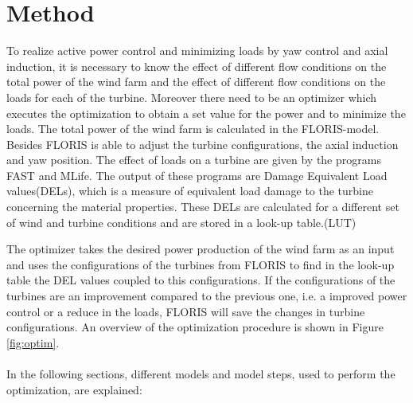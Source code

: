 \section{Method}
\label{sec:method}
	
	To realize active power control and minimizing loads by yaw control and axial induction, it is necessary to know the effect of different flow conditions on the total power of the wind farm and the effect of different flow conditions on the loads for each of the turbine. Moreover there need to be an optimizer which executes the optimization to obtain a set value for the power and to minimize the loads.\newline
	The total power of the wind farm is calculated in the FLORIS-model. Besides FLORIS is able to adjust the turbine configurations, the axial induction and yaw position.  
	The effect of loads on a turbine are given by the programs FAST and MLife. The output of these programs are Damage Equivalent Load values(DELs), which is a measure of equivalent load damage to the turbine concerning the material properties.\cite{Chougule2016} These DELs are calculated for a different set of wind and turbine conditions and are stored in a look-up table.(LUT)
	
	The optimizer takes the desired power production of the wind farm as an input and uses the configurations of the turbines from FLORIS to find in the look-up table the DEL values coupled to this configurations. If the configurations of the turbines are an improvement compared to the previous one, i.e. a improved power control or a reduce in the loads, FLORIS will save the changes in turbine configurations. An overview of the optimization procedure is shown in Figure \ref{fig:optim}. 
	\\
	\\
	In the following sections, different models and model steps, used to perform the optimization, are explained:
	
	
	
